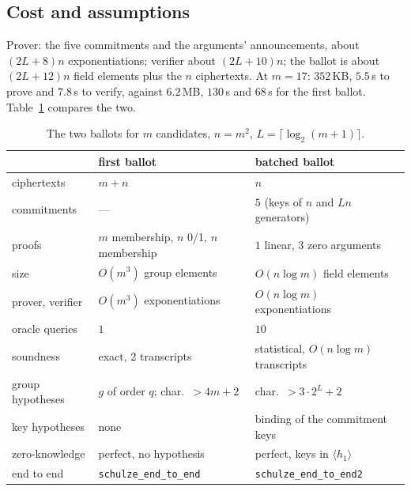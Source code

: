 \documentclass[11pt,a4paper]{article}
\newcommand{\rocq}[1]{\texttt{#1}}
\theoremstyle{remark}
\begin{document}
\subsection{Cost and assumptions}
Prover: the five commitments and the arguments' announcements, about $(2L
+ 8) n$ exponentiations; verifier about $(2L + 10) n$; the ballot is about
$(2L + 12) n$ field elements plus the $n$ ciphertexts. At $m = 17$: $352$\,KB,
$5.5$\,s to prove and $7.8$\,s to verify, against $6.2$\,MB, $130$\,s and
$68$\,s for the first ballot. Table~\ref{tab:two} compares the two.

\begin{table}[t]
  \centering
  \caption{The two ballots for $m$ candidates, $n = m^2$, $L = \lceil
  \log_2(m+1) \rceil$.}
  \label{tab:two}
  \begin{tabular}{@{}lll@{}}
    \toprule
     & first ballot & batched ballot \\
    \midrule
    ciphertexts & $m + n$ & $n$ \\
    commitments & --- & $5$ (keys of $n$ and $Ln$ generators) \\
    proofs & $m$ membership, $n$ 0/1, $n$ membership & $1$ linear, $3$ zero arguments \\
    size & $O(m^3)$ group elements & $O(n \log m)$ field elements \\
    prover, verifier & $O(m^3)$ exponentiations & $O(n \log m)$ exponentiations \\
    oracle queries & $1$ & $10$ \\
    soundness & exact, $2$ transcripts & statistical, $O(n \log m)$ transcripts \\
    group hypotheses & $g$ of order $q$; char.\ $> 4m + 2$ & char.\ $> 3 \cdot 2^L + 2$ \\
    key hypotheses & none & binding of the commitment keys \\
    zero-knowledge & perfect, no hypothesis & perfect, keys in $\langle h_1 \rangle$ \\
    end to end & \rocq{schulze\_end\_to\_end} & \rocq{schulze\_end\_to\_end2} \\
    \bottomrule
  \end{tabular}
\end{table}
\end{document}
